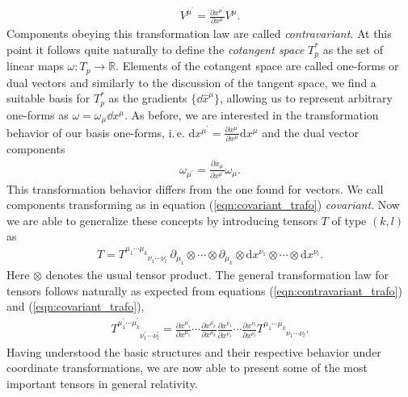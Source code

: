 \begin{align}
	V^{\mu^{\prime}}=\frac{\partial x^{\mu^{\prime}}}{\partial x^{\mu}} V^{\mu}. \label{eqn:contravariant_trafo}
\end{align}
Components obeying this transformation law are called \textit{contravariant}. At this point it follows quite naturally to define the \textit{cotangent space} $T_p^*$ as the set of linear maps $\omega: T_p \rightarrow \mathbb{R}$. Elements of the cotangent space are called one-forms or dual vectors and similarly to the discussion of the tangent space, we find a suitable basis for $T_p^*$ as the gradients $\{\dd\hat{x}^{\mu}\}$, allowing us to represent arbitrary one-forms as $\omega = \omega_{\mu} \dd x^{\mu}$. As before, we are interested in the transformation behavior of our basis one-forms, i.\,e. $\mathrm{d} x^{\mu^{\prime}}=\frac{\partial x^{\mu^{\prime}}}{\partial x^{\mu}} \mathrm{d} x^{\mu}$ and the dual vector components
\begin{align}
	\omega_{\mu^{\prime}}=\frac{\partial x_{\mu}}{\partial x^{\mu^{\prime}}} \omega_{\mu}.\label{eqn:covariant_trafo}
\end{align}
This transformation behavior differs from the one found for vectors. We call components transforming as in equation (\ref{eqn:covariant_trafo}) \textit{covariant}.
Now we are able to generalize these concepts by introducing tensors $T$ of type $(k,l)$ as
\begin{align}
T=T_{\phantom{\mu_{1} \cdots \mu_{k}}\nu_{1} \cdots \nu_{l}}^{\mu_{1} \cdots \mu_{k}} \ \partial_{\mu_{1}} \otimes \cdots \otimes \partial_{\mu_{k}} \otimes \mathrm{d} x^{\nu_{1}} \otimes \cdots \otimes \mathrm{d} x^{\nu_{l}}.
\end{align}
Here $\otimes$ denotes the usual tensor product.
The general transformation law for tensors follows naturally as expected from equations (\ref{eqn:contravariant_trafo}) and (\ref{eqn:covariant_trafo}),
\begin{align}
	T_{\phantom{\mu_{1}^{\prime} \cdots \mu_{k}^{\prime}}\nu_{1}^{\prime} \cdots \nu_{l}^{\prime}}^{\mu_{1}^{\prime} \cdots \mu_{k}^{\prime}}=\frac{\partial x^{\mu_{1}^{\prime}}}{\partial x^{\mu_{1}}} \cdots \frac{\partial x^{\mu_{k}^{\prime}}}{\partial x^{\mu_{k}}} \frac{\partial x^{\nu_{1}}}{\partial x^{\nu_{1}^{\prime}}} \cdots \frac{\partial x^{\nu_{l}}}{\partial x^{\nu_{l}^{\prime}}} T^{\mu_{1} \cdots \mu_{k}}_{\phantom{\mu_{1} \cdots \mu_{k}}\nu_{1} \cdots \nu_{l}}.
\end{align}
Having understood the basic structures and their respective behavior under coordinate transformations, we are now able to present some of the most important tensors in general relativity. \\
